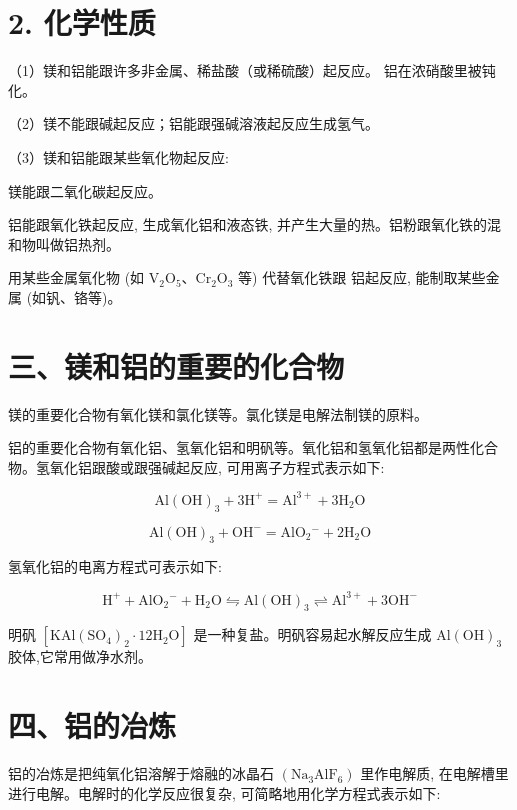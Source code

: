 \documentclass[10pt]{article}
\begin{document}
\section*{2. 化学性质}

（1）镁和铝能跟许多非金属、稀盐酸（或稀硫酸）起反应。 铝在浓硝酸里被钝化。

（2）镁不能跟碱起反应；铝能跟强碱溶液起反应生成氢气。

（3）镁和铝能跟某些氧化物起反应:

镁能跟二氧化碳起反应。

铝能跟氧化铁起反应, 生成氧化铝和液态铁, 并产生大量的热。铝粉跟氧化铁的混和物叫做铝热剂。

用某些金属氧化物 (如 \({\mathrm{V}}_{2}{\mathrm{O}}_{5}\text{、}{\mathrm{{Cr}}}_{2}{\mathrm{O}}_{3}\) 等) 代替氧化铁跟 铝起反应, 能制取某些金属 (如钒、铬等)。

\section*{三、镁和铝的重要的化合物}

镁的重要化合物有氧化镁和氯化镁等。氯化镁是电解法制镁的原料。

铝的重要化合物有氧化铝、氢氧化铝和明矾等。氧化铝和氢氧化铝都是两性化合物。氢氧化铝跟酸或跟强碱起反应, 可用离子方程式表示如下:

\[
\mathrm{{Al}}{\left( \mathrm{{OH}}\right) }_{3} + 3{\mathrm{H}}^{ + } = {\mathrm{{Al}}}^{3 + } + 3{\mathrm{H}}_{2}\mathrm{O}
\]

\[
\mathrm{{Al}}{\left( \mathrm{{OH}}\right) }_{3} + {\mathrm{{OH}}}^{ - } = {\mathrm{{AlO}}}_{2}{}^{ - } + 2{\mathrm{H}}_{2}\mathrm{O}
\]

氢氧化铝的电离方程式可表示如下:

\[
{\mathrm{H}}^{ + } + {\mathrm{{AlO}}}_{2}{}^{ - } + {\mathrm{H}}_{2}\mathrm{O} \leftrightharpoons \mathrm{{Al}}{\left( \mathrm{{OH}}\right) }_{3} \rightleftharpoons {\mathrm{{Al}}}^{3 + } + 3{\mathrm{{OH}}}^{ - }
\]

明矾 \(\left\lbrack {\mathrm{{KAl}}{\left( {\mathrm{{SO}}}_{4}\right) }_{2} \cdot {12}{\mathrm{H}}_{2}\mathrm{O}}\right\rbrack\) 是一种复盐。明矾容易起水解反应生成 \(\mathrm{{Al}}{\left( \mathrm{{OH}}\right) }_{3}\) 胶体,它常用做净水剂。

\section*{四、铝的冶炼}

铝的冶炼是把纯氧化铝溶解于熔融的冰晶石 \(\left( {{\mathrm{{Na}}}_{3}{\mathrm{{AlF}}}_{6}}\right)\) 里作电解质, 在电解槽里进行电解。电解时的化学反应很复杂, 可简略地用化学方程式表示如下:
\end{document}
